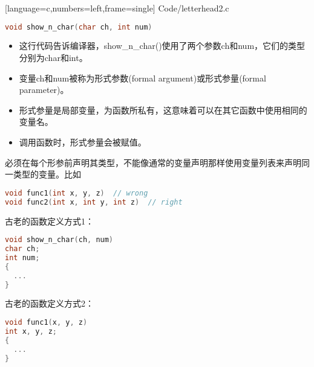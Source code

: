 \begin{frame}

[language=c,numbers=left,frame=single]
{Code/letterhead2.c}
\end{frame}


\begin{frame}[fragile]
\begin{lstlisting}[language=c,backgroundcolor=\color{red!10},title=函数头]
  void show_n_char(char ch, int num)
\end{lstlisting}
\begin{itemize}
\item
这行代码告诉编译器，{\tf show\_n\_char()}使用了两个参数{\tf ch}和{\tf num}，它们的类型分别为{\tf char}和{\tf int}。\\[0.1in]
\item
变量{\tf ch}和{\tf num}被称为形式参数{\tf (formal argument)}或形式参量{\tf (formal parameter)}。\\[0.1in]
\item 形式参量是局部变量，为函数所私有，这意味着可以在其它函数中使用相同的变量名。\\[0.1in]
\item 调用函数时，形式参量会被赋值。
\end{itemize}
\end{frame}

\begin{frame}[fragile]
必须在每个形参前声明其类型，不能像通常的变量声明那样使用变量列表来声明同一类型的变量。比如
\begin{lstlisting}[language=c,backgroundcolor=\color{red!10}]
void func1(int x, y, z)  // wrong 
void func2(int x, int y, int z)  // right
\end{lstlisting}

\end{frame}

\begin{frame}[fragile]
古老的函数定义方式1：
\begin{lstlisting}[language=c,backgroundcolor=\color{red!10}]
void show_n_char(ch, num)
char ch;
int num;
{
  ...
}
\end{lstlisting}
\end{frame}

\begin{frame}[fragile]
古老的函数定义方式2：
\begin{lstlisting}[language=c,backgroundcolor=\color{red!10}]
void func1(x, y, z)
int x, y, z;
{
  ... 
}
\end{lstlisting}
\end{frame}


